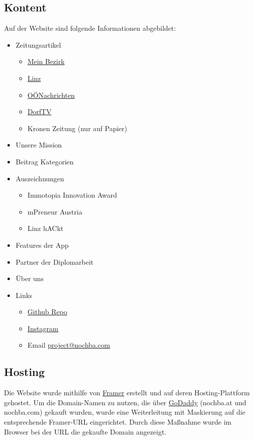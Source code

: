\subsection{Kontent}
Auf der Website sind folgende Informationen abgebildet:
\begin{itemize}
  \item Zeitungsartikel
        \begin{itemize}
          \item \href{https://www.meinbezirk.at/linz/c-wirtschaft/linzer-nachwuchs-hacker-beweisen-sich-in-nordmazedonien_a5654095}{Mein Bezirk}
          \item \href{https://www.linz.at/medienservice/2022/202203_114704.php}{Linz}
          \item \href{https://www.nachrichten.at/oberoesterreich/linz/von-linz-nach-nordmazedonien;art66,3728292}{OÖNachrichten}
          \item \href{https://jugendhackt.org/video/nochba/}{DorfTV}
          \item Kronen Zeitung (nur auf Papier)
        \end{itemize}
  \item Unsere Mission
  \item Beitrag Kategorien
  \item Auszeichnungen
        \begin{itemize}
          \item Immotopia Innovation Award
          \item mPreneur Austria
          \item Linz hACkt
        \end{itemize}
  \item Features der App
  \item Partner der Diplomarbeit
  \item Über uns
  \item Links
        \begin{itemize}
          \item \href{https://github.com/Martin-Hausleitner/Nochba}{Github Repo}
          \item \href{https://www.instagram.com/nochba.at/}{Instagram}
          \item Email \href{mailto:project@nochba.com}{project@nochba.com}
        \end{itemize}
\end{itemize}


\subsection{Hosting}
Die Website wurde mithilfe von \href{https://framer.com}{Framer} erstellt und auf deren
Hosting-Plattform gehostet. Um die Domain-Namen zu nutzen,
die über \href{https://www.godaddy.com/de-at}{GoDaddy} (nochba.at und nochba.com) gekauft wurden, wurde eine Weiterleitung
mit Maskierung auf die entsprechende Framer-URL
eingerichtet. Durch diese Maßnahme wurde im Browser bei der
URL die gekaufte Domain angezeigt.

